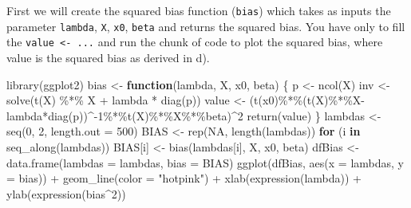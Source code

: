 \documentclass[
]{article}
\newenvironment{Shaded}{\begin{snugshade}}{\end{snugshade}}
\newcommand{\AttributeTok}[1]{\textcolor[rgb]{0.77,0.63,0.00}{#1}}
\newcommand{\ConstantTok}[1]{\textcolor[rgb]{0.00,0.00,0.00}{#1}}
\newcommand{\ControlFlowTok}[1]{\textcolor[rgb]{0.13,0.29,0.53}{\textbf{#1}}}
\newcommand{\DecValTok}[1]{\textcolor[rgb]{0.00,0.00,0.81}{#1}}
\newcommand{\FunctionTok}[1]{\textcolor[rgb]{0.00,0.00,0.00}{#1}}
\newcommand{\NormalTok}[1]{#1}
\newcommand{\OtherTok}[1]{\textcolor[rgb]{0.56,0.35,0.01}{#1}}
\newcommand{\SpecialCharTok}[1]{\textcolor[rgb]{0.00,0.00,0.00}{#1}}
\newcommand{\StringTok}[1]{\textcolor[rgb]{0.31,0.60,0.02}{#1}}
\begin{document}
First we will create the squared bias function (\texttt{bias}) which
takes as inputs the parameter \texttt{lambda}, \texttt{X}, \texttt{x0},
\texttt{beta} and returns the squared bias. You have only to fill the
\texttt{value\ \textless{}-\ ...} and run the chunk of code to plot the
squared bias, where value is the squared bias as derived in d).

\begin{Shaded}
\begin{Highlighting}[]
\FunctionTok{library}\NormalTok{(ggplot2)}
\NormalTok{bias }\OtherTok{\textless{}{-}} \ControlFlowTok{function}\NormalTok{(lambda, X, x0, beta) \{}
\NormalTok{  p }\OtherTok{\textless{}{-}} \FunctionTok{ncol}\NormalTok{(X)}
\NormalTok{  inv }\OtherTok{\textless{}{-}} \FunctionTok{solve}\NormalTok{(}\FunctionTok{t}\NormalTok{(X) }\SpecialCharTok{\%*\%}\NormalTok{ X }\SpecialCharTok{+}\NormalTok{ lambda }\SpecialCharTok{*} \FunctionTok{diag}\NormalTok{(p))}
\NormalTok{  value }\OtherTok{\textless{}{-}}\NormalTok{ (}\FunctionTok{t}\NormalTok{(x0)}\SpecialCharTok{\%*\%}\NormalTok{(}\FunctionTok{t}\NormalTok{(X)}\SpecialCharTok{\%*\%}\NormalTok{X}\SpecialCharTok{{-}}\NormalTok{lambda}\SpecialCharTok{*}\FunctionTok{diag}\NormalTok{(p))}\SpecialCharTok{\^{}{-}}\DecValTok{1}\SpecialCharTok{\%*\%}\FunctionTok{t}\NormalTok{(X)}\SpecialCharTok{\%*\%}\NormalTok{X}\SpecialCharTok{\%*\%}\NormalTok{beta)}\SpecialCharTok{\^{}}\DecValTok{2}
  \FunctionTok{return}\NormalTok{(value)}
\NormalTok{\}}
\NormalTok{lambdas }\OtherTok{\textless{}{-}} \FunctionTok{seq}\NormalTok{(}\DecValTok{0}\NormalTok{, }\DecValTok{2}\NormalTok{, }\AttributeTok{length.out =} \DecValTok{500}\NormalTok{)}
\NormalTok{BIAS }\OtherTok{\textless{}{-}} \FunctionTok{rep}\NormalTok{(}\ConstantTok{NA}\NormalTok{, }\FunctionTok{length}\NormalTok{(lambdas))}
\ControlFlowTok{for}\NormalTok{ (i }\ControlFlowTok{in} \FunctionTok{seq\_along}\NormalTok{(lambdas)) BIAS[i] }\OtherTok{\textless{}{-}} \FunctionTok{bias}\NormalTok{(lambdas[i], X, x0, beta)}
\NormalTok{dfBias }\OtherTok{\textless{}{-}} \FunctionTok{data.frame}\NormalTok{(}\AttributeTok{lambdas =}\NormalTok{ lambdas, }\AttributeTok{bias =}\NormalTok{ BIAS)}
\FunctionTok{ggplot}\NormalTok{(dfBias, }\FunctionTok{aes}\NormalTok{(}\AttributeTok{x =}\NormalTok{ lambdas, }\AttributeTok{y =}\NormalTok{ bias)) }\SpecialCharTok{+}
  \FunctionTok{geom\_line}\NormalTok{(}\AttributeTok{color =} \StringTok{"hotpink"}\NormalTok{) }\SpecialCharTok{+}
  \FunctionTok{xlab}\NormalTok{(}\FunctionTok{expression}\NormalTok{(lambda)) }\SpecialCharTok{+}
  \FunctionTok{ylab}\NormalTok{(}\FunctionTok{expression}\NormalTok{(bias}\SpecialCharTok{\^{}}\DecValTok{2}\NormalTok{))}
\end{Highlighting}
\end{Shaded}
\end{document}
